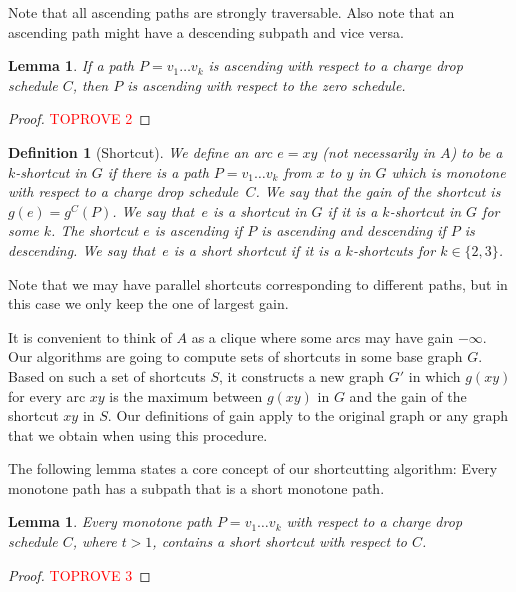 \documentclass[11pt]{article}
\newtheorem{lemma}[theorem]{Lemma}
\newtheorem{definition}[theorem]{Definition}
\begin{document}
Note that all ascending paths are strongly traversable. Also note that an ascending path might have a descending subpath and vice versa.


\begin{lemma}\label{lem:ascending_no_CDS}
    If a path $P=v_1\ldots v_k$ is ascending with respect to a charge drop schedule $C$, then $P$ is ascending with respect to the zero schedule.
\end{lemma}

\begin{proof}\textcolor{red}{TOPROVE 2}\end{proof}

\begin{definition}[Shortcut]
    We define an arc $e=xy$ (not necessarily in $A$) to be a $k$-\emph{shortcut} in $G$  if there is a path $P=v_1\ldots v_k$ from $x$ to $y$ in $G$ which is monotone with respect to a charge drop schedule~$C$.
    We say that the gain of the shortcut is 
     $g(e)=g^C(P)$. We say that~$e$ is a shortcut in $G$ if it is a $k$-shortcut in $G$ for some $k$.
    The shortcut $e$ is ascending if $P$ is ascending and descending if $P$ is descending. We say that~$e$ is a short shortcut if it is a $k$-shortcuts for $k\in \{ 2,3\}$.
\end{definition}

Note that we may have parallel shortcuts corresponding to different paths, but in this case we  only keep the one of largest gain.

It is convenient to think of $A$ as a clique where some arcs may have gain $-\infty$.
Our algorithms are going to compute sets of shortcuts in some base graph $G$.
Based on such a set of shortcuts $S$, it constructs a new graph $G'$ in which $g(xy)$ for 
every arc $xy$ is the maximum between 
$g(xy)$ in $G$ and the gain of the shortcut $xy$ in $S$. Our definitions of gain apply to the original graph or any graph that we obtain when using this procedure.

The following lemma states a core concept of our shortcutting algorithm: Every monotone path has a subpath that is a short monotone path.

\begin{lemma}\label{lemma:mono-has-shortcut}
    Every monotone path $P=v_1 \ldots v_k$ with respect to a charge drop schedule $C$, where $t>1$, contains a short shortcut with respect to $C$.
\end{lemma}

\begin{proof}\textcolor{red}{TOPROVE 3}\end{proof}
\end{document}
